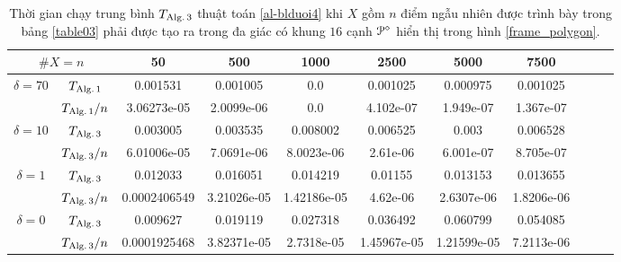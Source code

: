 \documentclass[12pt,a4paper,openany,oneside]{report}
\begin{document}
\begin{table}[ht]
	\begin{center}\renewcommand{\arraystretch}{1.2}\small
		\setlength\tabcolsep{0.05cm}
		\begin{tabular}{|c|c||c|c|c|c|c|c|c|c|c|}
			\hline
			\multicolumn {2}{|c||}{\footnotesize $\#X=n$} & 50 & 500 & 1000 & 2500 & 5000 & 7500 \\ 
			\hline		
			\hline
			{ $\delta = 70$}
			
			& $T_{\rm Alg.\, 1}$  &0.001531 & 0.001005 & 0.0 & 0.001025 & 0.000975 & 0.001025\\
			
			& $T_{\rm Alg.\, 1}/n$&3.06273e-05 & 2.0099e-06 & 0.0 & 4.102e-07 & 1.949e-07 & 1.367e-07 \\
			\hline
			{ $\delta = 10$}
			
			& $T_{\rm Alg.\, 3}$  &0.003005 & 0.003535 & 0.008002 & 0.006525 & 0.003 & 0.006528 \\
			
			& $T_{\rm Alg.\, 3}/n$&6.01006e-05 & 7.0691e-06 & 8.0023e-06 & 2.61e-06 & 6.001e-07 & 8.705e-07  \\
			\hline
			{ $\delta = 1$}
			
			& $T_{\rm Alg.\, 3}$  &0.012033 & 0.016051 & 0.014219 & 0.01155 & 0.013153 & 0.013655\\
			
			& $T_{\rm Alg.\, 3}/n$&0.0002406549 & 3.21026e-05 & 1.42186e-05 & 4.62e-06 & 2.6307e-06 & 1.8206e-06\\
			\hline
			{ $\delta = 0$}
			
			& $T_{\rm Alg.\, 3}$  &0.009627 & 0.019119 & 0.027318 & 0.036492 & 0.060799 & 0.054085 \\
			
			& $T_{\rm Alg.\, 3}/n$&0.0001925468 & 3.82371e-05 & 2.7318e-05 & 1.45967e-05 & 1.21599e-05 & 7.2113e-06\\
			\hline
		\end{tabular}
		\caption{Thời gian chạy trung bình $T_{\rm Alg.\,3}$  thuật toán \ref{al-blduoi4} khi $X$ gồm $n$ điểm ngẫu nhiên được trình bày trong bảng \ref{table03} phải được tạo ra trong đa giác có khung $16$ cạnh ${\cal P}^\diamond$ hiển thị trong hình \ref{frame_polygon}.}
		\label{table02}
	\end{center}
\end{table} 	
\end{document}
